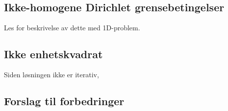 \documentclass{article}
\begin{document}
\subsection{Ikke-homogene Dirichlet grensebetingelser}
Les \cite[seksjon 3.2]{poisson-fdm} for beskrivelse av dette med 1D-problem.

\subsection{Ikke enhetskvadrat}
Siden løsningen ikke er iterativ, 
\subsection{Forslag til forbedringer}


\end{document}
